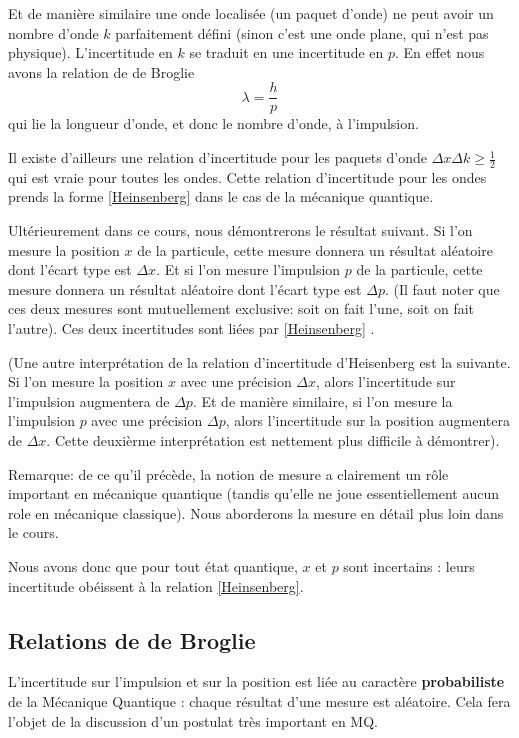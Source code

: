 \documentclass{book}
\begin{document}
Et de manière similaire une onde localisée (un paquet d'onde) ne peut avoir un nombre d'onde $k$  parfaitement défini (sinon c'est une onde plane, qui n'est pas physique). L'incertitude en $k$ se traduit en une incertitude en $p$. En effet nous avons la relation de de Broglie
\begin{equation}
    \label{Broglie}
    \lambda = \frac{h}{p}
    \end{equation}
qui lie la longueur d'onde, et donc le nombre d'onde, à l'impulsion.

Il existe d'ailleurs une relation d'incertitude pour les paquets d'onde $\Delta x \Delta k \geq \frac{1}{2}$ qui est vraie pour toutes les ondes. Cette relation d'incertitude pour les ondes prends la forme \eqref{Heinsenberg} dans le cas de la mécanique quantique.

Ultérieurement dans ce cours, nous démontrerons le résultat suivant.
Si l'on mesure la position $x$ de la particule, cette mesure donnera un résultat aléatoire dont l'écart type est $\Delta x$. Et si l'on mesure l'impulsion $p$ de la particule, cette mesure donnera un résultat aléatoire dont l'écart type est $\Delta p$. (Il faut noter que ces deux mesures sont mutuellement exclusive: soit on fait l'une, soit on fait l'autre). Ces deux incertitudes sont liées par \eqref{Heinsenberg} .

(Une autre interprétation de la relation d'incertitude d'Heisenberg est la suivante. Si l'on mesure la position $x$ avec une précision $\Delta x$, alors l'incertitude sur l'impulsion augmentera de $\Delta p$. Et de manière  similaire, si l'on mesure la l'impulsion $p$ avec une précision $\Delta p$, alors l'incertitude sur la position augmentera de $\Delta x$. Cette deuxièrme interprétation est nettement plus difficile à démontrer).

Remarque: de ce qu'il précède, la notion de mesure a clairement un rôle important en mécanique quantique (tandis qu'elle ne joue essentiellement aucun role en mécanique classique). Nous aborderons la mesure en détail plus loin dans le cours.

Nous avons donc que pour tout état quantique, $x$ et $p$ sont incertains : leurs incertitude obéissent à la relation \eqref{Heinsenberg}. \\


\subsection{Relations de de Broglie}
L'incertitude sur l'impulsion et sur la position est liée au caractère \textbf{probabiliste} de la Mécanique Quantique : chaque résultat d'une mesure est aléatoire. Cela fera l'objet de la discussion d'un postulat très important en MQ. 
\end{document}
